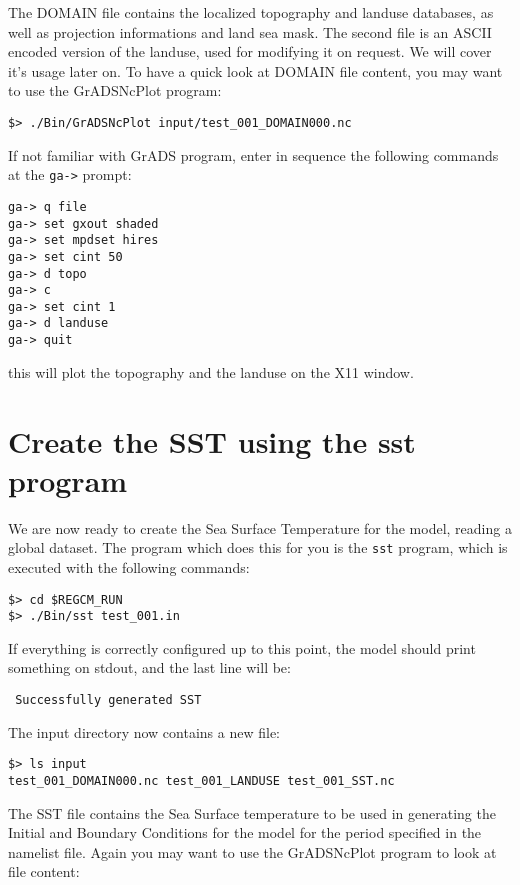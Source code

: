 The DOMAIN file contains the localized topography and landuse databases, as
well as projection informations and land sea mask. The second file is an ASCII
encoded version of the landuse, used for modifying it on request. We will cover
it's usage later on.  To have a quick look at DOMAIN file content, you may want
to use the GrADSNcPlot program:

\begin{Verbatim}
$> ./Bin/GrADSNcPlot input/test_001_DOMAIN000.nc
\end{Verbatim}

If not familiar with GrADS program, enter in sequence the following commands at
the \verb=ga->= prompt:

\begin{Verbatim}
ga-> q file
ga-> set gxout shaded
ga-> set mpdset hires
ga-> set cint 50
ga-> d topo
ga-> c
ga-> set cint 1
ga-> d landuse
ga-> quit
\end{Verbatim}

this will plot the topography and the landuse on the X11 window.

\section{Create the SST using the sst program}

We are now ready to create the Sea Surface Temperature for the model, reading a
global dataset.
The program which does this for you is the \verb=sst= program, which is executed
with the following commands:

\begin{Verbatim}
$> cd $REGCM_RUN
$> ./Bin/sst test_001.in
\end{Verbatim}

If everything is correctly configured up to this point, the model should print
something on stdout, and the last line will be:

\begin{Verbatim}
 Successfully generated SST
\end{Verbatim}

The input directory now contains a new file:

\begin{Verbatim}
$> ls input
test_001_DOMAIN000.nc test_001_LANDUSE test_001_SST.nc
\end{Verbatim}

The SST file contains the Sea Surface temperature to be used in generating the
Initial and Boundary Conditions for the model for the period specified in the
namelist file. Again you may want to use the GrADSNcPlot program to look at
file content:

